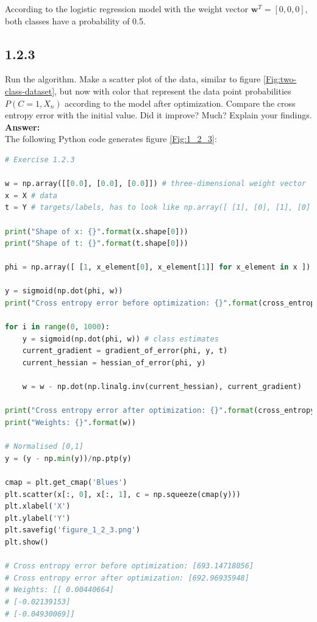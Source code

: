 \documentclass[a4paper]{article}
\begin{document}
According to the logistic regression model with the weight vector $\textbf{w}^T = [0, 0, 0]$, both classes have a probability of 0.5.




\subsection*{1.2.3}

Run the algorithm. Make a scatter plot of the data, similar to figure \ref{Fig:two-class-dataset}, but now with color that represent the data point probabilities $P(C = 1, X_n)$ according to the model after optimization. Compare the cross entropy error with the initial value. Did it improve? Much? Explain your findings.\\

\textbf{Answer:}\\


The following Python code generates figure \ref{Fig:1_2_3}:

\begin{lstlisting}[language=Python]
# Exercise 1.2.3

w = np.array([[0.0], [0.0], [0.0]]) # three-dimensional weight vector
x = X # data
t = Y # targets/labels, has to look like np.array([ [1], [0], [1], [0] ])

print("Shape of x: {}".format(x.shape[0]))
print("Shape of t: {}".format(t.shape[0]))

phi = np.array([ [1, x_element[0], x_element[1]] for x_element in x ]) # feature vector

y = sigmoid(np.dot(phi, w))
print("Cross entropy error before optimization: {}".format(cross_entropy_error(y, t)))

for i in range(0, 1000):
    y = sigmoid(np.dot(phi, w)) # class estimates
    current_gradient = gradient_of_error(phi, y, t)
    current_hessian = hessian_of_error(phi, y)
    
    w = w - np.dot(np.linalg.inv(current_hessian), current_gradient)
    
print("Cross entropy error after optimization: {}".format(cross_entropy_error(y, t)))
print("Weights: {}".format(w))

# Normalised [0,1]
y = (y - np.min(y))/np.ptp(y)

cmap = plt.get_cmap('Blues')
plt.scatter(x[:, 0], x[:, 1], c = np.squeeze(cmap(y)))
plt.xlabel('X')
plt.ylabel('Y')
plt.savefig('figure_1_2_3.png')
plt.show()

# Cross entropy error before optimization: [693.14718056]
# Cross entropy error after optimization: [692.96935948]
# Weights: [[ 0.00440664]
# [-0.02139153]
# [-0.04930069]]
\end{lstlisting}
\end{document}
